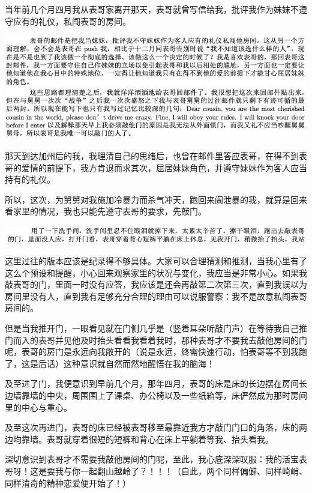 \documentclass[9pt, b5paper]{article}
\begin{document}
当年前几个月四月我从表哥家离开那天，表哥就曾写信给我，批评我作为妹妹不遵守应有的礼仪，私闯表哥的房间。

\begin{center}
\includegraphics[width=.9\linewidth]{./pic/p1p55.png}
\end{center}

那天到达加州后的我，我理清自己的思绪后，也曾在邮件里答应表哥，在得不到表哥的爱情的前提下，我方肯退而求其次，屈居妹妹角色，并遵守妹妹作为客人应当持有的礼仪。

所以，这次，为舅舅对我施加冷暴力而杀气冲天，跑回来闹泄暴的我，就算是回来看家里的情况，我也只能先遵守表哥的要求，先敲门。 

\begin{center}
\includegraphics[width=.9\linewidth]{./pic/p1p67-1.png}
\end{center}

这里过往的版本应该是纪录得不够具体。大家可以合理猜测和推测，当我心里有了这么个预设和提醒，小心回来观察家里的状况与变化，我应当是非常小心。如果我敲表哥的门，里面一时没有应答，我应该是还会再敲第二次第三次，直到我误以为房间里没有人，直到我有足够充分合理的理由可以说服警察：我不是故意私闯表哥房间的。

但是当我推开门，一眼看见就在门侧几乎是（竖着耳朵听敲门声）在等待我自己推门而入的表哥并见他及时抬头看看我看着我时，那种表哥才不要我去敲他房间的门呢，表哥的房门是永远向我敞开的（说是永远，终需快速行动，怕表哥等不到我跑了，这是后话）这种意识就自然而然地醒悟在我的脑海！

及至进了门，我便意识到早前几个月，那年四月，表哥的床是床的长边摆在房间长边墙靠墙的中央，周围围上了课桌、办公椅以及一些纸箱等，床俨然成为那时房间里的中心与重心。

及至这次再进门，表哥的床已经被表哥移至最靠近我方才敲门门口的角落，床的两边均靠墙。表哥就穿着很短的短裤和背心在床上平躺着等我、抬头看我。

深切意识到表哥才不需要我敲他房间的门呢，至此，我心底深深叹服：我的活宝表哥呀！这是要我与你一起翻山越岭了？！！！（自此，两个同样偏僻、同样崎峭、同样清奇的精神恋爱便开始了！）
\end{document}
